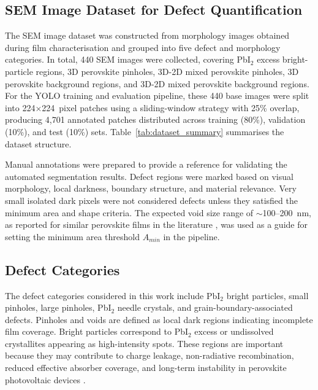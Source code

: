 \documentclass[pdflatex,sn-mathphys-num,iicol]{sn-jnl}
\theoremstyle{thmstyleone}
\theoremstyle{thmstyletwo}
\theoremstyle{thmstylethree}
\begin{document}
\subsection{SEM Image Dataset for Defect Quantification}
\label{subsec:sem_dataset}

The SEM image dataset was constructed from morphology images obtained
during film characterisation and grouped into five defect and
morphology categories. In total, 440 SEM images were collected,
covering PbI$_2$ excess bright-particle regions, 3D perovskite
pinholes, 3D-2D mixed perovskite pinholes, 3D perovskite background
regions, and 3D-2D mixed perovskite background regions. For the YOLO
training and evaluation pipeline, these 440 base images were split
into 224$\times$224~pixel patches using a sliding-window strategy with
25\% overlap, producing 4{,}701 annotated patches distributed across
training (80\%), validation (10\%), and test (10\%) sets.
Table~\ref{tab:dataset_summary} summarises the dataset structure.


Manual annotations were prepared to provide a reference for validating
the automated segmentation results. Defect regions were marked based
on visual morphology, local darkness, boundary structure, and material
relevance. Very small isolated dark pixels were not considered defects
unless they satisfied the minimum area and shape criteria. The
expected void size range of $\sim$100--200~nm, as reported for similar
perovskite films in the literature \cite{chang2026}, was used as a
guide for setting the minimum area threshold $A_{min}$ in the pipeline.

\subsection{Defect Categories}\label{subsec:defect_categories}

The defect categories considered in this work include PbI$_2$ bright
particles, small pinholes, large pinholes, PbI$_2$ needle crystals,
and grain-boundary-associated defects. Pinholes and voids are defined
as local dark regions indicating incomplete film coverage. Bright
particles correspond to PbI$_2$ excess or undissolved crystallites
appearing as high-intensity spots. These regions are important because
they may contribute to charge leakage, non-radiative recombination,
reduced effective absorber coverage, and long-term instability in
perovskite photovoltaic devices \cite{chang2026,hu2023}.
\end{document}
